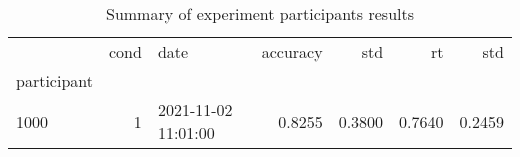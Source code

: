 \begin{table}
\centering
\caption{Summary of experiment participants results}
\label{table-subject-summary}
\begin{tabular}{lrlrrrr}
\toprule
{} & cond &                 date & accuracy &    std &     rt &    std \\
participant &      &                      &          &        &        &        \\
\midrule
1000        &    1 &  2021-11-02 11:01:00 &   0.8255 & 0.3800 & 0.7640 & 0.2459 \\
\bottomrule
\end{tabular}
\end{table}
